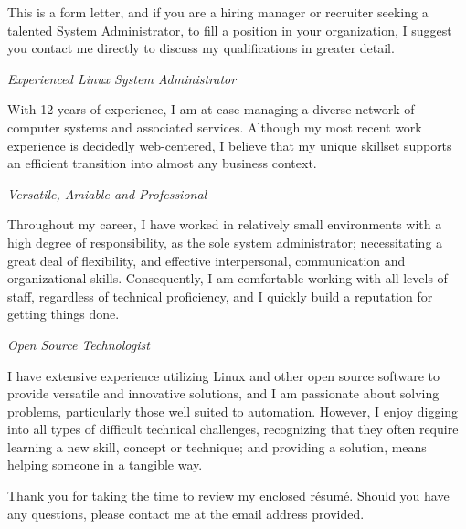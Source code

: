 \documentclass[11pt,letterpaper,sans]{moderncv}
\def\Resume{{r\'{e}sum\'{e}}}
\begin{document}
This is a form letter, and if you are a hiring manager or recruiter seeking a talented
System Administrator, to fill a position in your organization, I suggest you contact me 
directly to discuss my qualifications in greater detail. 

\emph{\newline{}Experienced Linux System Administrator}

With 12 years of experience, I am at ease managing a diverse network of computer systems and associated
services. Although my most recent work experience is decidedly web-centered, I believe that my unique
skillset supports an efficient transition into almost any business context. 

\emph{\newline{}Versatile, Amiable and Professional}

Throughout my career, I have worked in relatively small environments with a high degree of 
responsibility, as the sole system administrator; necessitating a great deal of flexibility, and 
effective interpersonal, communication and organizational skills. Consequently, I am comfortable working 
with all levels of staff, regardless of technical proficiency, and I quickly build a reputation 
for getting things done. 

\emph{\newline{}Open Source Technologist}

I have extensive experience utilizing Linux and other open source software to provide versatile and 
innovative solutions, and I am passionate about solving problems, particularly those well suited to 
automation. However, I enjoy digging into all types of difficult technical challenges, recognizing 
that they often require learning a new skill, concept or technique; and providing a solution, means 
helping someone in a tangible way.\newline

Thank you for taking the time to review my enclosed \Resume. Should you have any questions, please
contact me at the email address provided.

\makeletterclosing
\end{document}
